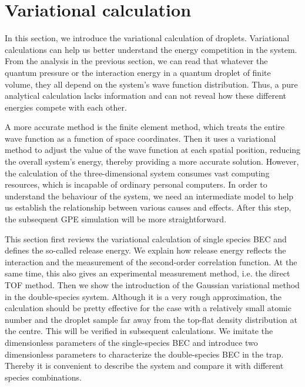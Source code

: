 \section{Variational calculation}
\label{sec:var_cal}

In this section, we introduce the variational calculation of droplets. Variational calculations can help us better understand the energy competition in the system. From the analysis in the previous section, we can read that whatever the quantum pressure or the interaction energy in a quantum droplet of finite volume,  they all depend on the system's wave function distribution. Thus, a pure analytical calculation lacks information and can not reveal how these different energies compete with each other.

A more accurate method is the finite element method, which treats the entire wave function as a function of space coordinates. Then it uses a variational method to adjust the value of the wave function at each spatial position, reducing the overall system's energy, thereby providing a more accurate solution. However, the calculation of the three-dimensional system consumes vast computing resources, which is incapable of ordinary personal computers. In order to understand the behaviour of the system, we need an intermediate model to help us establish the relationship between various causes and effects. After this step, the subsequent GPE simulation will be more straightforward.

This section first reviews the variational calculation of single species BEC and defines the so-called release energy. We explain how release energy reflects the interaction and the measurement of the second-order correlation function. At the same time, this also gives an experimental measurement method, i.e. the direct TOF method. Then we show the introduction of the Gaussian variational method in the double-species system. Although it is a very rough approximation, the calculation should be pretty effective for the case with a relatively small atomic number and the droplet sample far away from the top-flat density distribution at the centre. This will be verified in subsequent calculations. We imitate the dimensionless parameters of the single-species BEC and introduce two dimensionless parameters to characterize the double-species BEC in the trap. Thereby it is convenient to describe the system and compare it with different species combinations.

